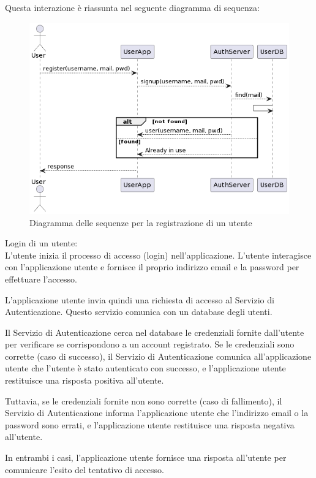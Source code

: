 Questa interazione è riassunta nel seguente diagramma di sequenza:
\begin{figure}[htbp]
    \centering
    \includegraphics[width=\textwidth]{images/signup.png}
    \caption{Diagramma delle sequenze per la registrazione di un utente}
    \label{fig:signup}
\end{figure}

Login di un utente:\\
L'utente inizia il processo di accesso (login) nell'applicazione. L'utente interagisce con l'applicazione utente e fornisce il proprio indirizzo email e la password per effettuare l'accesso.

L'applicazione utente invia quindi una richiesta di accesso al Servizio di Autenticazione. Questo servizio comunica con un database degli utenti.

Il Servizio di Autenticazione cerca nel database le credenziali fornite dall'utente per verificare se corrispondono a un account registrato. Se le credenziali sono corrette (caso di successo), il Servizio di Autenticazione comunica all'applicazione utente che l'utente è stato autenticato con successo, e l'applicazione utente restituisce una risposta positiva all'utente.

Tuttavia, se le credenziali fornite non sono corrette (caso di fallimento), il Servizio di Autenticazione informa l'applicazione utente che l'indirizzo email o la password sono errati, e l'applicazione utente restituisce una risposta negativa all'utente.

In entrambi i casi, l'applicazione utente fornisce una risposta all'utente per comunicare l'esito del tentativo di accesso.\\

